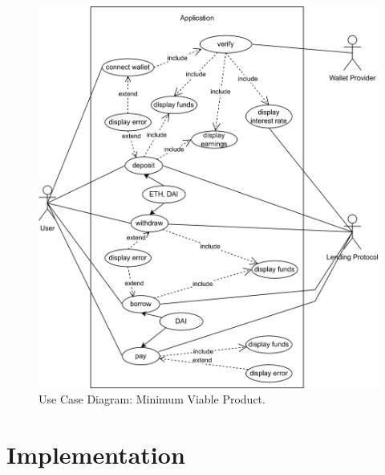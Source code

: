 \documentclass[11pt,a4paper]{report}
\begin{document}
\begin{figure}[htp]
	\centering
	\includegraphics[width=1\textwidth]{./images/USECASE-full_nofl}
	\caption{Use Case Diagram: Minimum Viable Product.}
	\label{fig:usecase-mvp}
\end{figure}
\newpage


\chapter{Implementation} \label{ch:impl}
\end{document}
